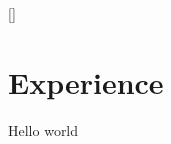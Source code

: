 \documentclass[11pt,a4paper]{article}
\begin{document}
\titleformat{\section}{
  \vspace{-4pt}\scshape\raggedright\large
}{}{0em}{}[\color{black}\titlerule \vspace{-5pt}]

\section{Experience}
Hello world
\end{document}
